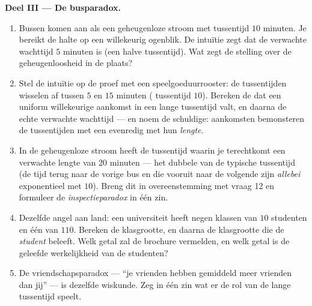 \begin{problem}
\medskip
\noindent\textbf{Deel III --- De busparadox.}
\begin{enumerate}[resume]
  \item Bussen komen aan als een geheugenloze stroom met  tussentijd
        $10$ minuten. Je bereikt de halte op een willekeurig ogenblik. De
        intuïtie zegt dat de verwachte wachttijd $5$ minuten is (een halve
        tussentijd). Wat zegt de stelling over de geheugenloosheid in de
        plaats?
  \item Stel de intuïtie op de proef met een speelgoeduurrooster: de
        tussentijden wisselen af tussen $5$ en $15$ minuten (
        tussentijd $10$). Bereken de  dat een uniform willekeurige aankomst
        in een lange tussentijd valt, en daarna de echte verwachte wachttijd
        --- en noem de schuldige: aankomsten bemonsteren de tussentijden met
        een  evenredig met hun \emph{lengte}.
  \item In de geheugenloze stroom heeft de tussentijd waarin je terechtkomt
        een verwachte lengte van $20$ minuten --- het dubbele van de typische
        tussentijd (de tijd terug naar de vorige bus en die vooruit naar de
        volgende zijn \emph{allebei} exponentieel met  $10$). Breng
        dit in overeenstemming met vraag 12 en formuleer de
        \emph{inspectieparadox} in één zin.
  \item Dezelfde angel aan land: een universiteit heeft negen klassen van $10$
        studenten en één van $110$. Bereken de  klasgrootte, en
        daarna de klasgrootte die de \emph{ student} beleeft. Welk
        getal zal de brochure vermelden, en welk getal is de geleefde
        werkelijkheid van de studenten?
  \item De vriendschapsparadox --- ``je vrienden hebben gemiddeld meer
        vrienden dan jij'' --- is dezelfde wiskunde. Zeg in één zin wat er de
        rol van de lange tussentijd speelt.
\end{enumerate}


\end{problem}
